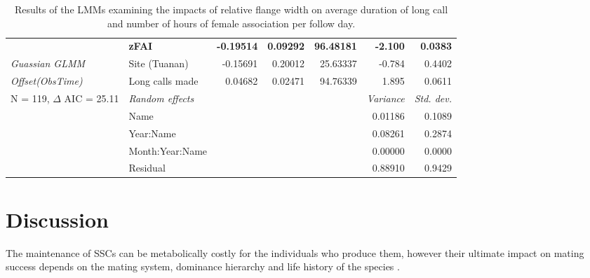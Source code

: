 \begin{table}
{\begin{tabular}{l l r r r r r}
   & \textbf{zFAI} & \textbf{-0.19514} & \textbf{0.09292} & \textbf{96.48181} & \textbf{-2.100} & \textbf{0.0383}\\
   
    \textit{Guassian GLMM} & Site (Tuanan) & -0.15691 & 0.20012 & 25.63337 & -0.784 & 0.4402\\
    
\textit{Offset(ObsTime)}  & Long calls made & 0.04682 & 0.02471 & 94.76339 & 1.895 & 0.0611 \\
   
   
    \cline{2-7}
    
      N = 119, $\Delta$ AIC = 25.11  & \textit{Random effects} & & & & \textit{Variance} & \textit{Std. dev.}\\
        
    \cline{2-7} 
    
    & Name & & & & 0.01186 & 0.1089 \\

    & Year:Name & & & & 0.08261 & 0.2874 \\
    
    & Month:Year:Name & &&  &  0.00000 &  0.0000 \\

    & Residual & & & & 0.88910 & 0.9429 \\
    
     \hline 

    \end{tabular}
    }
    \caption{Results of the LMMs examining the impacts of relative flange width on average duration of long call and number of hours of female association per follow day. }
\end{table}



\section{Discussion}

The maintenance of SSCs can be metabolically costly for the individuals who produce them, however their ultimate impact on mating success depends on the mating system, dominance hierarchy and life history of the species \citep{Kappeler.2004}. 

